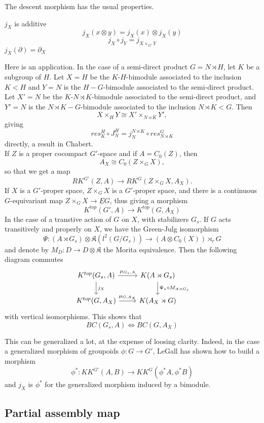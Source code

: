 The descent morphism has the usual properties.
\begin{prop}
$j_X$ is additive
\[j_X(x\otimes y ) = j_X(x)\otimes j_X(y)\]
\[j_X \circ j_Y = j_{X\times_{G'} Y} \]
$j_X(\partial ) =\partial_X$
\end{prop}

Here is an application. In the case of a semi-direct product $G = N\rtimes H$, let $K$ be a subgroup of $H$. Let $X=H$ be the $K$-$H$-bimodule associated to the inclusion $K<H$ and $Y = N$ is the $H-G$-bimodule associated to the semi-direct product. Let $X'=N$ be the $K$-$N\rtimes K$-bimodule associated to the semi-direct product, and $Y' = N$ is the $N\rtimes K-G$-bimodule associated to the inclusion $N\rtimes K < G$. Then 
\[ X\times_{H} Y \cong X'\times_{N\rtimes K} Y',\]
giving 
\[res_{K}^H \circ J_N^H = j_N^{N\rtimes K} \circ res_{N\rtimes K}^G\]
directly, a result in Chabert.\\

If $Z$ is a proper cocompact $G'$-space and if $A=C_0(Z)$, then 
\[A_X \cong C_0(Z\times_G X ),\]
so that we get a map
\[RK^{G'}(Z, A) \rightarrow RK^G(Z\times_G X,A_X).\]
If $X$ is a $G'$-proper space, $Z\times_G X$ is a $G'$-proper space, and there is a continuous $G$-equivariant map $Z\times_G X \rightarrow \underline E G$, thus giving a morphism
\[ K^{top}(G',A) \rightarrow K^{top}(G,A_X)  \]
In the case of a transtive action of $G$ on $X$, with stabilizers $G_s$. If $G$ acts transitively and properly on $X$, we have the Green-Julg isomorphism 
\[\Psi :(A\rtimes G_s)\otimes \mathfrak K(l^2(G/G_s))\rightarrow  (A\otimes C_0(X)) \rtimes_r G \]
and denote by $M_D: D\rightarrow D\otimes \mathfrak K$ the Morita equivalence. Then the following diagram commutes
\[\begin{tikzcd}
K^{top}(G_s, A) \arrow{d}{j_X} \arrow{r}{\mu_{G_s,A}} & K(A\rtimes G_s) \arrow{d}{\Psi_* \circ M_{A\rtimes G_s}}\\ 
K^{top}(G,A_X)\arrow{r}{\mu_{G,A_X}} & K(A_X\rtimes G)
\end{tikzcd}\]
with vertical isomorphisms. This shows that 
\[BC(G_s, A) \iff BC(G,A_X)\] 

This can be generalized a lot, at the expense of loosing clarity. Indeed, in the case a generalized morphism of groupoids $\phi : G \rightarrow G'$, LeGall has shown \cite{} how to build a morphism
\[\phi^* : KK^{G'}(A,B) \rightarrow KK^G(\phi^* A, \phi^* B)\] 
and $j_X$ is $\phi^*$ for the generalized morphism induced by a bimodule. 

\subsection{Partial assembly map}

